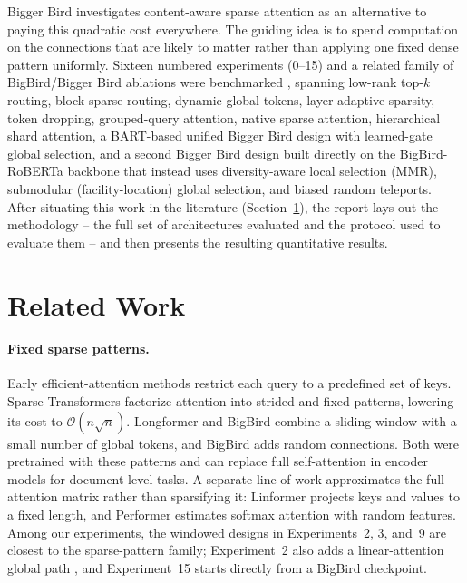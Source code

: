\documentclass[11pt]{article}
\newcommand{\bigO}{\mathcal{O}}
\begin{document}
Bigger Bird investigates content-aware sparse attention as an alternative to
paying this quadratic cost everywhere. The guiding idea is to spend computation
on the connections that are likely to matter rather than applying one fixed
dense pattern uniformly. Sixteen numbered experiments (0--15) and a related
family of BigBird/Bigger Bird ablations were benchmarked \citep{zaheer2020bigbird}, spanning low-rank
top-$k$ routing, block-sparse routing, dynamic global tokens, layer-adaptive
sparsity, token dropping, grouped-query attention, native sparse attention,
hierarchical shard attention, a BART-based unified Bigger Bird design with
learned-gate global selection, and a second Bigger Bird design built directly
on the BigBird-RoBERTa backbone that instead uses diversity-aware local
selection (MMR), submodular (facility-location) global selection, and biased
random teleports. After situating this work in the literature
(Section~\ref{sec:related}), the report lays out the methodology -- the full
set of architectures evaluated and the protocol used to evaluate them -- and
then presents the resulting quantitative results.

\section{Related Work}
\label{sec:related}

\paragraph{Fixed sparse patterns.}
Early efficient-attention methods restrict each query to a predefined set of
keys. Sparse Transformers \citep{child2019sparse} factorize attention into
strided and fixed patterns, lowering its cost to $\bigO(n\sqrt{n})$.
Longformer \citep{beltagy2020longformer} and BigBird \citep{zaheer2020bigbird}
combine a sliding window with a small number of global tokens, and BigBird
adds random connections. Both were pretrained with these patterns and can
replace full self-attention in encoder models for document-level tasks. A
separate line of work approximates the full attention matrix rather than
sparsifying it: Linformer \citep{wang2020linformer} projects keys and values
to a fixed length, and Performer \citep{choromanski2021performer} estimates
softmax attention with random features. Among our experiments, the windowed
designs in Experiments~2, 3, and~9 are closest to the sparse-pattern family;
Experiment~2 also adds a linear-attention global path
\citep{qin2024lightning}, and Experiment~15 starts directly from a BigBird
checkpoint.
\end{document}
